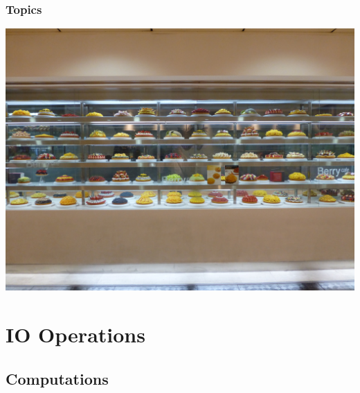 \documentclass{beamer}
\begin{document}
\begin{frame}
  \PresentationTitleSlide
\end{frame}

\begin{frame}
  \frametitle{Topics}
  \tableofcontents
\end{frame}

\begin{frame}[fragile]
\begin{center}
\includegraphics[scale=0.075]
    {figures/jpg/pic08.jpg}
\end{center}
\end{frame}
\section{IO Operations }

\subsection{Computations}
\end{document}
